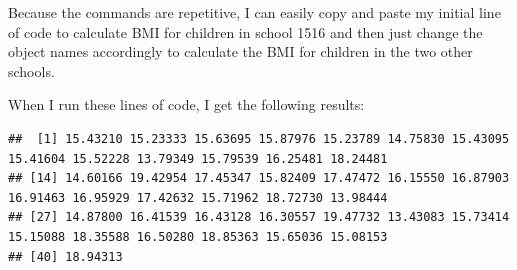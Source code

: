 \documentclass[
  12pt,
]{book}
\newenvironment{Shaded}{\begin{snugshade}}{\end{snugshade}}
\newcommand{\DecValTok}[1]{\textcolor[rgb]{0.00,0.00,0.81}{#1}}
\newcommand{\DocumentationTok}[1]{\textcolor[rgb]{0.56,0.35,0.01}{\textbf{\textit{#1}}}}
\newcommand{\NormalTok}[1]{#1}
\newcommand{\SpecialCharTok}[1]{\textcolor[rgb]{0.00,0.00,0.00}{#1}}
\begin{document}
\begin{Shaded}
\end{Shaded}

Because the commands are repetitive, I can easily copy and paste my initial line of code to calculate BMI for children in school 1516 and then just change the object names accordingly to calculate the BMI for children in the two other schools.

When I run these lines of code, I get the following results:

\begin{Shaded}
\end{Shaded}

\begin{verbatim}
##  [1] 15.43210 15.23333 15.63695 15.87976 15.23789 14.75830 15.43095 15.41604 15.52228 13.79349 15.79539 16.25481 18.24481
## [14] 14.60166 19.42954 17.45347 15.82409 17.47472 16.15550 16.87903 16.91463 16.95929 17.42632 15.71962 18.72730 13.98444
## [27] 14.87800 16.41539 16.43128 16.30557 19.47732 13.43083 15.73414 15.15088 18.35588 16.50280 18.85363 15.65036 15.08153
## [40] 18.94313
\end{verbatim}
\end{document}

